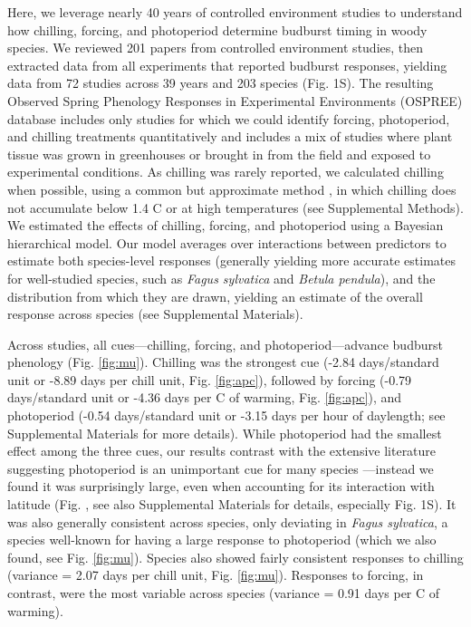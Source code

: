 \documentclass{article}
\begin{document}
\par Here, we leverage nearly 40 years of controlled environment studies to understand how chilling, forcing, and photoperiod determine budburst timing in woody species. %
We reviewed 201 papers from controlled environment studies, then extracted data from all experiments that reported budburst responses, yielding data from 72 studies across 39 years and 203 species (Fig. 1S). The resulting Observed Spring Phenology Responses in Experimental Environments (OSPREE) database includes only studies for which we could identify forcing, photoperiod, and chilling treatments quantitatively and includes a mix of studies where plant tissue was grown in greenhouses or brought in from the field and exposed to experimental conditions. As chilling was rarely reported, we calculated chilling when possible, using a common but approximate method \citep{richardson1974}, in which chilling does not accumulate below 1.4 \degree C or at high temperatures (see Supplemental Methods). We estimated the effects of chilling, forcing, and photoperiod using a Bayesian hierarchical model. Our model averages over interactions between predictors to estimate both species-level responses (generally yielding more accurate estimates for well-studied species, such as \emph{Fagus sylvatica} and \emph{Betula pendula}), and the distribution from which they are drawn, yielding an estimate of the overall response across species (see Supplemental Materials).

\par Across studies, all cues---chilling, forcing, and photoperiod---advance budburst phenology (Fig. \ref {fig:mu}). Chilling was the strongest cue (-2.84 days/standard unit or -8.89 days per chill unit, Fig. \ref {fig:apc}), followed by forcing (-0.79 days/standard unit or -4.36 days per \degree C of warming, Fig. \ref {fig:apc}), and photoperiod (-0.54 days/standard unit or -3.15 days per hour of daylength; see Supplemental Materials for more details). While photoperiod had the smallest effect among the three cues, our results contrast with the extensive literature suggesting photoperiod is an unimportant cue for many species \citep{zohner2016,koerner2010a}---instead we found it was surprisingly large, even when accounting for its interaction with latitude (Fig. , see also Supplemental Materials for details, especially Fig. 1S). It was also generally consistent across species, only deviating in  \emph{Fagus sylvatica}, a species well-known for having a large response to photoperiod (which we also found, see Fig. \ref {fig:mu}). Species also showed fairly consistent responses to chilling (variance = 2.07 days per chill unit, Fig. \ref {fig:mu}).
Responses to forcing, in contrast, were the most variable across species (variance = 0.91 days per \degree C of warming).
\end{document}
